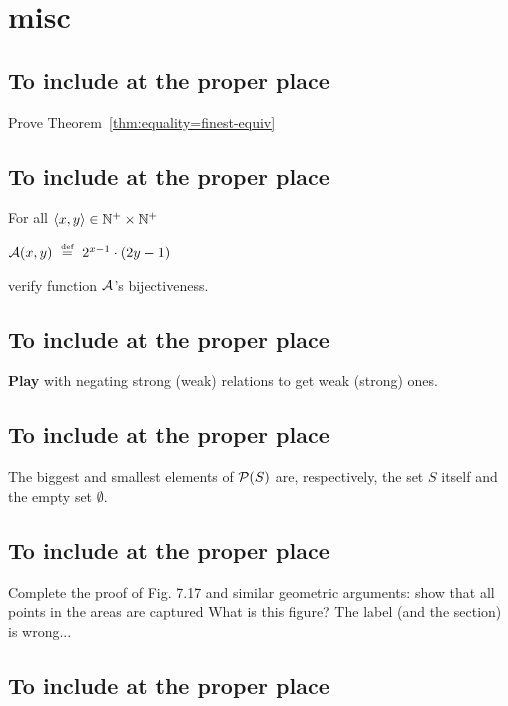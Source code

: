 

\section{misc}


\subsection{To include at the proper place}

Prove Theorem~\ref{thm:equality=finest-equiv}

\subsection{To include at the proper place}

For all $\langle x,y \rangle \in \mathbb{N}^+ \times \mathbb{N}^+$

$\mbox{$\cal A$}(x,y) \ \stackrel{\mbox{{\tiny def}}}{=} \ 2^{x-1} \cdot (2y -1)$

verify function $\mbox{$\cal A$}$'s
bijectiveness.


\subsection{To include at the proper place}

\textbf{ Play} with negating strong (weak) relations to get weak (strong) ones.

 
\subsection{To include at the proper place}

 The biggest and smallest elements of
${\cal P}(S)$ are, respectively, the set $S$ itself and the empty set
$\emptyset$.


\subsection{To include at the proper place}

Complete the proof of Fig. 7.17 and similar geometric arguments: show
that all points in the areas are captured
{\Denis What is this figure? The label (and the section) is wrong... }


\subsection{To include at the proper place}

